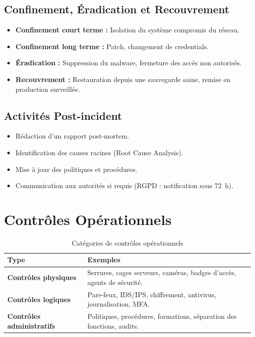 \subsection{Confinement, Éradication et Recouvrement}
\begin{itemize}
    \item \textbf{Confinement court terme :} Isolation du système compromis du réseau.
    \item \textbf{Confinement long terme :} Patch, changement de credentials.
    \item \textbf{Éradication :} Suppression du malware, fermeture des accès non autorisés.
    \item \textbf{Recouvrement :} Restauration depuis une sauvegarde saine, remise en production surveillée.
\end{itemize}

\subsection{Activités Post-incident}
\begin{itemize}
    \item Rédaction d'un rapport post-mortem.
    \item Identification des causes racines (Root Cause Analysis).
    \item Mise à jour des politiques et procédures.
    \item Communication aux autorités si requis (RGPD : notification sous 72~h).
\end{itemize}

\section{Contrôles Opérationnels}

\begin{table}[H]
\centering
\small
\begin{tabular}{p{3cm}p{9cm}}
    \toprule
    \textbf{Type} & \textbf{Exemples} \\
    \midrule
    \textbf{Contrôles physiques}       & Serrures, cages serveurs, caméras, badges d'accès, agents de sécurité. \\
    \textbf{Contrôles logiques}        & Pare-feux, IDS/IPS, chiffrement, antivirus, journalisation, MFA. \\
    \textbf{Contrôles administratifs}  & Politiques, procédures, formations, séparation des fonctions, audits. \\
    \bottomrule
\end{tabular}
\caption{Catégories de contrôles opérationnels}
\end{table}

